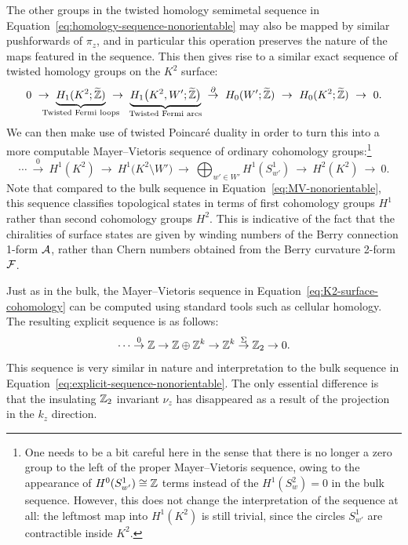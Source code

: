 The other groups in the twisted homology semimetal sequence in Equation~\eqref{eq:homology-sequence-nonorientable} may also be mapped by similar pushforwards of $\pi_z$, and in particular this operation preserves the nature of the maps featured in the sequence. This then gives rise to a similar exact sequence of twisted homology groups on the $K^2$ surface:
\begin{equation}
	0\ \to\ \underbrace{H_1(K^2;\ext{\Z})}_{\mathclap{\text{Twisted Fermi loops}}}\ \to\ \underbrace{H_1\big(K^2, W';\ext{\Z}\big)}_{\mathclap{\text{Twisted Fermi arcs}}}\ \overset{\partial}{\to}\ H_0(W';\ext{\Z})\ \to\ H_0(K^2;\ext{\Z})\ \to\ 0.
\end{equation}
We can then make use of twisted Poincaré duality in order to turn this into a more computable Mayer--Vietoris sequence of ordinary cohomology groups:\footnote{
	One needs to be a bit careful here in the sense that there is no longer a zero group to the left of the proper Mayer--Vietoris sequence, owing to the appearance of $H^0(S_{w'}^1)\cong\mathbb{Z}$ terms instead of the $H^1(S_w^2)=0$ in the bulk sequence. However, this does not change the interpretation of the sequence at all: the leftmost map into $H^1(K^2)$ is still trivial, since the circles $S_{w'}^1$ are contractible inside $K^2$.}
\begin{equation}\label{eq:K2-surface-cohomology}
	\cdots\ \overset{0}{\to}\ H^1(K^2)\ \to\ H^1\big(K^2\setminus W'\big)\ \to\ \bigoplus_{w'\in W'} H^1(S_{w'}^1)\ \to\ H^2(K^2)\ \to\ 0.
\end{equation}
Note that compared to the bulk sequence in Equation~\eqref{eq:MV-nonorientable}, this sequence classifies topological states in terms of first cohomology groups $H^1$ rather than second cohomology groups $H^2$. This is indicative of the fact that the chiralities of surface states are given by winding numbers of the Berry connection 1-form $\mathcal{A}$, rather than Chern numbers obtained from the Berry curvature 2-form $\mathcal{F}$.

Just as in the bulk, the Mayer--Vietoris sequence in Equation~\eqref{eq:K2-surface-cohomology} can be computed using standard tools such as cellular homology. The resulting explicit sequence is as follows:
\begin{equation}\label{eq:K2-MV-explicit}
	\cdots \overset{0}{\to} \mathbb{Z} \to \mathbb{Z}\oplus\mathbb{Z}^k \to \mathbb{Z}^k \overset{\Sigma}{\to} \mathbb{Z}_2 \to 0.
\end{equation}
This sequence is very similar in nature and interpretation to the bulk sequence in Equation~\eqref{eq:explicit-sequence-nonorientable}. The only essential difference is that the insulating $\mathbb{Z}_2$ invariant $\nu_z$ has disappeared as a result of the projection in the $k_z$ direction.

